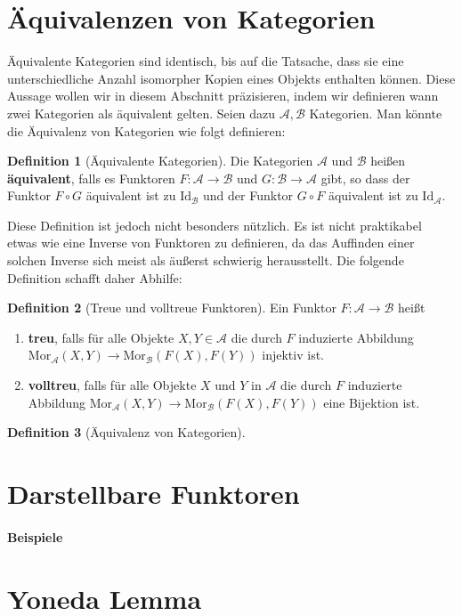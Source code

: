 \documentclass{article}
\theoremstyle{plain}
\theoremstyle{definition}
\newtheorem{defn}{Definition}[section]
\theoremstyle{remark}
\begin{document}
\section{Äquivalenzen von Kategorien}
Äquivalente Kategorien sind identisch, bis auf die Tatsache, dass sie eine unterschiedliche Anzahl isomorpher Kopien eines Objekts enthalten können. Diese Aussage wollen wir in diesem Abschnitt präzisieren, indem wir definieren wann zwei Kategorien als äquivalent gelten. Seien dazu $\mathcal{A}, \mathcal{B}$ Kategorien. Man könnte die Äquivalenz von Kategorien wie folgt definieren:

\begin{defn}[Äquivalente Kategorien]
Die Kategorien $\mathcal{A}$ und $\mathcal{B}$ heißen \textbf{äquivalent}, falls es Funktoren $F: \mathcal{A} \rightarrow \mathcal{B}$ und $G: \mathcal{B} \rightarrow \mathcal{A}$ gibt, so dass der Funktor $F \circ G$ äquivalent ist zu $\text{Id}_{\mathcal{B}}$ und der Funktor $G \circ F$ äquivalent ist zu $\text{Id}_\mathcal{A}$.
\end{defn}

Diese Definition ist jedoch nicht besonders nützlich. Es ist nicht praktikabel etwas wie eine Inverse von Funktoren zu definieren, da das Auffinden einer solchen Inverse sich meist als äußerst schwierig herausstellt. Die folgende Definition schafft daher Abhilfe:

\begin{defn}[Treue und volltreue Funktoren]
Ein Funktor $F: \mathcal{A} \rightarrow \mathcal{B}$ heißt
\begin{enumerate}
	\item \textbf{treu}, falls für alle Objekte $X,Y \in \mathcal{A}$ die durch $F$ induzierte Abbildung $\text{Mor}_\mathcal{A}(X,Y) \rightarrow \text{Mor}_\mathcal{B}(F(X),F(Y))$ injektiv ist.
	\item \textbf{volltreu}, falls für alle Objekte $X$ und $Y$ in $\mathcal{A}$ die durch $F$ induzierte Abbildung $\text{Mor}_\mathcal{A}(X,Y) \rightarrow \text{Mor}_\mathcal{B}(F(X),F(Y))$ eine Bijektion ist.
\end{enumerate}
\end{defn}

\begin{defn}[Äquivalenz von Kategorien]

\end{defn}

\section{Darstellbare Funktoren}

\paragraph{Beispiele}

\section{Yoneda Lemma}
\end{document}
